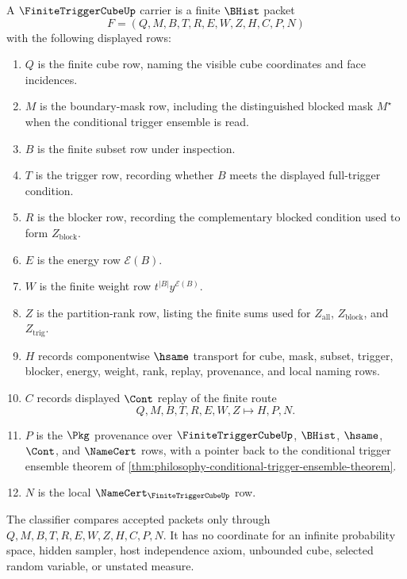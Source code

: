 \begin{definition}
\label{def:finite-trigger-cube-carrier}
A $\FiniteTriggerCubeUp$ carrier is a finite $\BHist$ packet
$$
F=(Q,M,B,T,R,E,W,Z,H,C,P,N)
$$
with the following displayed rows:
\begin{enumerate}
\item $Q$ is the finite cube row, naming the visible cube coordinates and face incidences.
\item $M$ is the boundary-mask row, including the distinguished blocked mask $M^{\star}$ when the conditional trigger ensemble is read.
\item $B$ is the finite subset row under inspection.
\item $T$ is the trigger row, recording whether $B$ meets the displayed full-trigger condition.
\item $R$ is the blocker row, recording the complementary blocked condition used to form $Z_{\mathrm{block}}$.
\item $E$ is the energy row $\mathcal{E}(B)$.
\item $W$ is the finite weight row $t^{|B|}y^{\mathcal{E}(B)}$.
\item $Z$ is the partition-rank row, listing the finite sums used for $Z_{\mathrm{all}}$, $Z_{\mathrm{block}}$, and $Z_{\mathrm{trig}}$.
\item $H$ records componentwise $\hsame$ transport for cube, mask, subset, trigger, blocker, energy, weight, rank, replay, provenance, and local naming rows.
\item $C$ records displayed $\Cont$ replay of the finite route
$$
Q,M,B,T,R,E,W,Z \longmapsto H,P,N .
$$
\item $P$ is the $\Pkg$ provenance over $\FiniteTriggerCubeUp$, $\BHist$, $\hsame$, $\Cont$, and $\NameCert$ rows, with a pointer back to the conditional trigger ensemble theorem of \autoref{thm:philosophy-conditional-trigger-ensemble-theorem}.
\item $N$ is the local $\NameCert_{\FiniteTriggerCubeUp}$ row.
\end{enumerate}
The classifier compares accepted packets only through $Q,M,B,T,R,E,W,Z,H,C,P,N$. It has no coordinate for an infinite probability space, hidden sampler, host independence axiom, unbounded cube, selected random variable, or unstated measure.
\end{definition}

